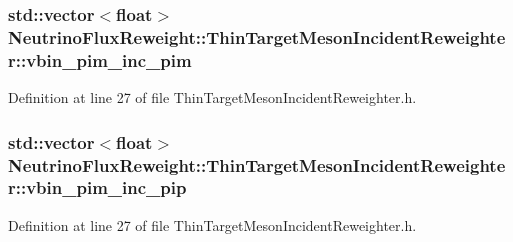 \hypertarget{class_neutrino_flux_reweight_1_1_thin_target_meson_incident_reweighter_ad9fb46f9b120a879ab057578902ba63e}{
\subsubsection[{vbin\-\_\-pim\-\_\-inc\-\_\-pim}]{\setlength{\rightskip}{0pt plus 5cm}std\-::vector$<$float$>$ Neutrino\-Flux\-Reweight\-::\-Thin\-Target\-Meson\-Incident\-Reweighter\-::vbin\-\_\-pim\-\_\-inc\-\_\-pim}}\label{class_neutrino_flux_reweight_1_1_thin_target_meson_incident_reweighter_ad9fb46f9b120a879ab057578902ba63e}


Definition at line 27 of file Thin\-Target\-Meson\-Incident\-Reweighter.\-h.

\hypertarget{class_neutrino_flux_reweight_1_1_thin_target_meson_incident_reweighter_a91fcf6a2aae6942bca236752fa38af15}{
\subsubsection[{vbin\-\_\-pim\-\_\-inc\-\_\-pip}]{\setlength{\rightskip}{0pt plus 5cm}std\-::vector$<$float$>$ Neutrino\-Flux\-Reweight\-::\-Thin\-Target\-Meson\-Incident\-Reweighter\-::vbin\-\_\-pim\-\_\-inc\-\_\-pip}}\label{class_neutrino_flux_reweight_1_1_thin_target_meson_incident_reweighter_a91fcf6a2aae6942bca236752fa38af15}


Definition at line 27 of file Thin\-Target\-Meson\-Incident\-Reweighter.\-h.

